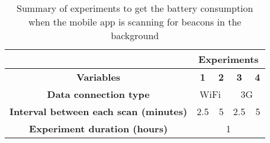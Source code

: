 \begin{table}[]
\centering
\begin{tabular}{@{}|c|c|c|c|c|@{}}
\toprule
\multicolumn{1}{|l|}{}                     & \multicolumn{4}{c|}{{\bf Experiments}}                                                                \\ \midrule
{\bf Variables}                            & {\bf 1}                  & {\bf 2}                & {\bf 3}                  & {\bf 4}                \\ \midrule
{\bf Data connection type}                 & \multicolumn{2}{c|}{WiFi}                         & \multicolumn{2}{c|}{3G}                           \\ \midrule
{\bf Interval between each scan (minutes)} & \multicolumn{1}{r|}{2.5} & \multicolumn{1}{r|}{5} & \multicolumn{1}{r|}{2.5} & \multicolumn{1}{r|}{5} \\ \midrule
{\bf Experiment duration (hours)}          & \multicolumn{4}{c|}{1}                                                                                \\ \bottomrule
\end{tabular}
\caption[Battery consumption results]{Summary of experiments to get the battery consumption when the mobile
app is scanning for beacons in the background}
\label{tab:experiments_battery}
\end{table}
